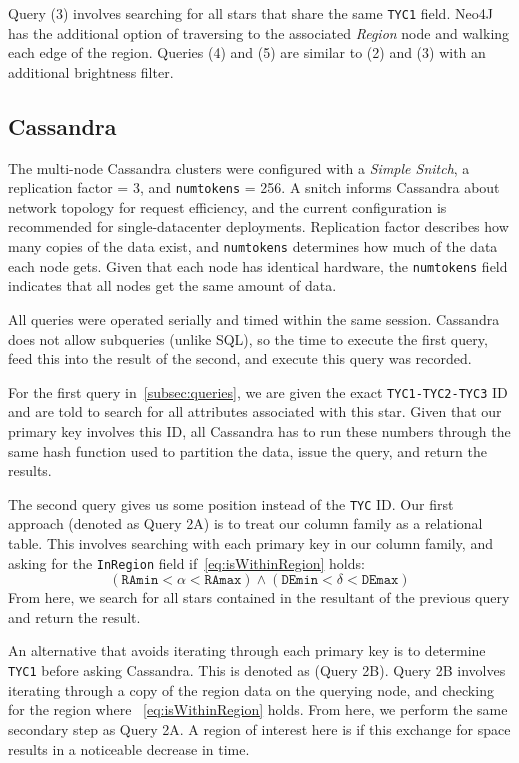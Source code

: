 Query (3) involves searching for all stars that share the same \texttt{TYC1} field.
Neo4J has the additional option of traversing to the associated \textit{Region} node and walking each edge of the
region.
Queries (4) and (5) are similar to (2) and (3) with an additional brightness filter.

\subsection{Cassandra}\label{subsec:cassandra}
The multi-node Cassandra clusters were configured with a \textit{Simple Snitch}, a replication factor = 3, and \texttt{num\textunderscore tokens} = 256.
A snitch informs Cassandra about network topology for request efficiency, and the current configuration
is recommended for single-datacenter deployments.
Replication factor describes how many copies of the data exist, and \texttt{num\textunderscore tokens} determines
how much of the data each node gets.
Given that each node has identical hardware, the \texttt{num\textunderscore tokens} field indicates that all nodes
get the same amount of data.

All queries were operated serially and timed within the same session.
Cassandra does not allow subqueries (unlike SQL), so the time to execute the first query, feed this
into the result of the second, and execute this query was recorded.

For the first query in~\autoref{subsec:queries}, we are given the exact \texttt{TYC1-TYC2-TYC3} ID and are told to
search for all attributes associated with this star.
Given that our primary key involves this ID, all Cassandra has to run these numbers through the same hash function
used to partition the data, issue the query, and return the results.

The second query gives us some position instead of the \texttt{TYC} ID\@.
Our first approach (denoted as Query 2A) is to treat our column family as a relational table.
This involves searching with each primary key in our column family, and asking for the \texttt{InRegion} field
if~\autoref{eq:isWithinRegion} holds:
\begin{equation}\label{eq:isWithinRegion}
    \left(\texttt{RAmin} < \alpha < \texttt{RAmax}\right) \land \left(\texttt{DEmin} < \delta < \texttt{DEmax}\right)
\end{equation}
From here, we search for all stars contained in the resultant of the previous query and return the result.

An alternative that avoids iterating through each primary key is to determine \texttt{TYC1} before asking Cassandra.
This is denoted as (Query 2B).
Query 2B involves iterating through a copy of the region data on the querying node, and checking for the region where
~\autoref{eq:isWithinRegion} holds.
From here, we perform the same secondary step as Query 2A\@.
A region of interest here is if this exchange for space results in a noticeable decrease in time.


